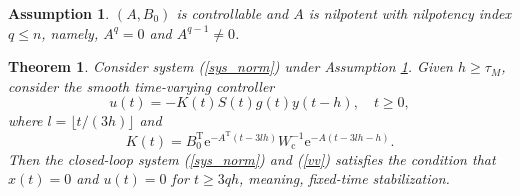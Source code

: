 \documentclass[10pt,a4paper]{amsart}
\newtheorem{assumption}{Assumption}
\newtheorem{theorem}{Theorem}
\begin{document}
\begin{assumption}
\label{ass0}$(A,B_{0})$ is controllable and $A$ is nilpotent with nilpotency
index $q\leq n$, namely, $A^{q}=0$ and $A^{q-1}\neq0$.
\end{assumption}

\begin{theorem}
Consider system (\ref{sys_norm}) under Assumption \ref{ass0}. Given $h\geq
\tau_{M}$, consider the smooth time-varying controller
\begin{equation}
u(t)=-K\left(  t\right)  S(t)g\left(
t\right)  y\left(  t-h\right)  ,\quad t\geq0, \label{vv}%
\end{equation}
where $l=\lfloor t/(3h)\rfloor$ and
\begin{equation}
K\left(  t\right)  =B_{0}^{\mathrm{T}}\mathrm{e}^{-A^{\mathrm{T}}\left(
t-3lh\right)  }W_{\mathrm{c}}^{-1}\mathrm{e}^{-A\left(  t-3lh-h\right)  }.
\label{K_n}%
\end{equation}
Then the closed-loop system (\ref{sys_norm}) and (\ref{vv}) satisfies the
condition that $x(t)=0$ and $u(t)=0$ for $t\geq3qh$, meaning, fixed-time stabilization.
\end{theorem}
\end{document}
